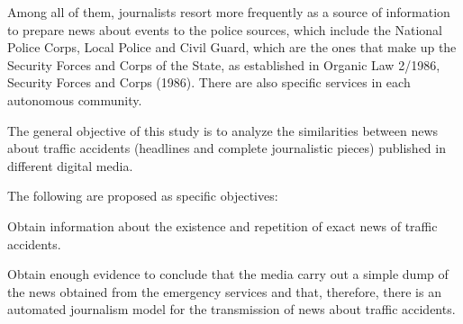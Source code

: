 Among all of them, journalists resort more frequently as a source of
information to prepare news about events to the police sources, which
include the National Police Corps, Local Police and Civil Guard, which
are the ones that make up the Security Forces and Corps of the State, as
established in Organic Law 2/1986, Security Forces and Corps (1986).
There are also specific services in each autonomous community.

The general objective of this study is to analyze the similarities
between news about traffic accidents (headlines and complete
journalistic pieces) published in different digital media.

The following are proposed as specific objectives:

Obtain information about the existence and repetition of exact news of
traffic accidents.

Obtain enough evidence to conclude that the media carry out a simple
dump of the news obtained from the emergency services and that,
therefore, there is an automated journalism model for the transmission
of news about traffic accidents.